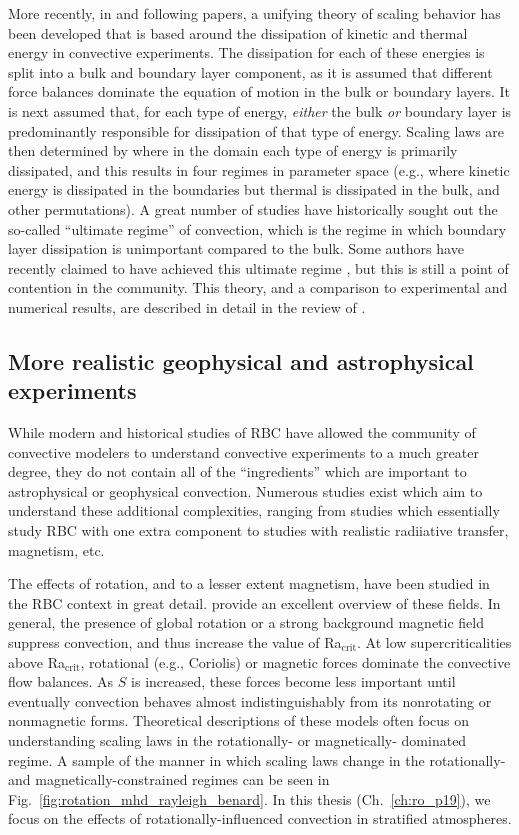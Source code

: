 More recently, in \citet{grossman&lohse2000} and following papers, a unifying theory of scaling behavior has been developed that is based around the dissipation of kinetic and thermal energy in convective experiments.
The dissipation for each of these energies is split into a bulk and boundary layer component, as it is assumed that different force balances dominate the equation of motion in the bulk or boundary layers.
It is next assumed that, for each type of energy, \emph{either} the bulk \emph{or} boundary layer is predominantly responsible for dissipation of that type of energy.
Scaling laws are then determined by where in the domain each type of energy is primarily dissipated, and this results in four regimes in parameter space (e.g., where kinetic energy is dissipated in the boundaries but thermal is dissipated in the bulk, and other permutations).
A great number of studies have historically sought out the so-called ``ultimate regime'' of convection, which is the regime in which boundary layer dissipation is unimportant compared to the bulk.
Some authors have recently claimed to have achieved this ultimate regime \citep[see e.g.,][]{zhu&all2018}, but this is still a point of contention in the community.
This theory, and a comparison to experimental and numerical results, are described in detail in the review of \citet{ahlers&all2009}.

\subsection{More realistic geophysical and astrophysical experiments}
While modern and historical studies of RBC have allowed the community of convective modelers to understand convective experiments to a much greater degree, they do not contain all of the ``ingredients'' which are important to astrophysical or geophysical convection.
Numerous studies exist which aim to understand these additional complexities, ranging from studies which essentially study RBC with one extra component to studies with realistic radiiative transfer, magnetism, etc.

The effects of rotation, and to a lesser extent magnetism, have been studied in the RBC context in great detail.
\citet{plumley&julien2019} provide an excellent overview of these fields.
In general, the presence of global rotation or a strong background magnetic field suppress convection, and thus increase the value of Ra$_{\text{crit}}$.
At low supercriticalities above Ra$_{\text{crit}}$, rotational (e.g., Coriolis) or magnetic forces dominate the convective flow balances.
As $S$ is increased, these forces become less important until eventually convection behaves almost indistinguishably from its nonrotating or nonmagnetic forms.
Theoretical descriptions of these models often focus on understanding scaling laws in the rotationally- \citep[e.g.,][]{julien&all2012} or magnetically- \citep[e.g.,][]{cioni&all2000} dominated regime.
A sample of the manner in which scaling laws change in the rotationally- and magnetically-constrained regimes can be seen in Fig.~\ref{fig:rotation_mhd_rayleigh_benard}.
In this thesis (Ch.~\ref{ch:ro_p19}), we focus on the effects of rotationally-influenced convection in stratified atmospheres.

